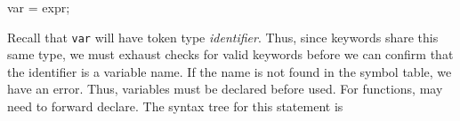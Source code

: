 \documentclass{report}
\begin{document}
\begin{itemize}
            \bigbreak \noindent 
            \begin{cppcode}
            var = expr; 
            \end{cppcode}
            \bigbreak \noindent 
            Recall that \texttt{var} will have token type \textit{identifier}. Thus, since keywords share this same type, we must exhaust checks for valid keywords before we can confirm that the identifier is a variable name. If the name is not found in the symbol table, we have an error. Thus, variables must be declared before used. For functions, may need to forward declare. 
            \bigbreak \noindent 
            The syntax tree for this statement is 
            \bigbreak \noindent 

    \end{itemize}

    \pagebreak 
\end{document}
